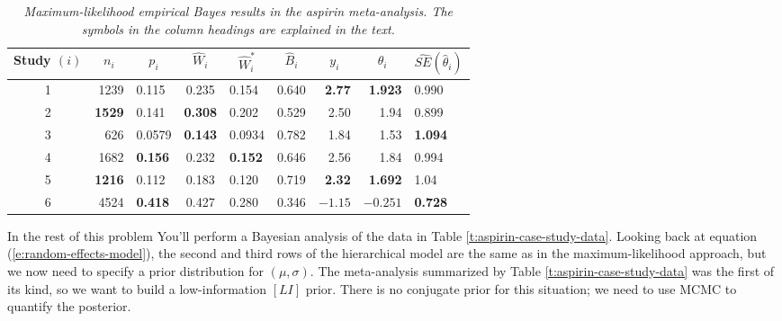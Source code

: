 \documentclass[12pt]{article}
\begin{document}
\begin{table}[t!]

\centering

\caption{\textit{Maximum-likelihood empirical Bayes results in the aspirin meta-analysis. The symbols in the column headings are explained in the text.}}

\label{t:mle-results}

\bigskip

\begin{tabular}{c|rlclcrrl}

Study $( i )$ & \multicolumn{1}{c}{$n_i$} & \multicolumn{1}{c}{$p_i$} & $\hat{ W }_i$ & \multicolumn{1}{c}{$\hat{ W }_i^*$} & $\hat{ B }_i$ & \multicolumn{1}{c}{$y_i$} & \multicolumn{1}{c}{$\hat{ \theta }_i$} & \multicolumn{1}{c}{$\widehat{ SE } \! \left( \hat{ \theta }_i \right)$}\\

\hline

1 & 1239 & 0.115 & 0.235 & 0.154 & 0.640 & \textbf{2.77} & \textbf{1.923} & 0.990 \\

2 & \textbf{1529} & 0.141 & \textbf{0.308} & 0.202 & 0.529 & 2.50 & 1.94 & 0.899 \\

3 & 626 & 0.0579 & \textbf{0.143} & 0.0934 & 0.782 & 1.84 & 1.53 & \textbf{1.094} \\

4 & 1682 & \textbf{0.156} & 0.232 & \textbf{0.152} & 0.646 & 2.56 & 1.84 & 0.994 \\

5 & \textbf{1216} & 0.112 & 0.183 & 0.120 & 0.719 & \textbf{2.32} & \textbf{1.692} & 1.04 \\

6 & 4524 & \textbf{0.418} & 0.427 & 0.280 & 0.346 & $-1.15$ & $-0.251$ & \textbf{0.728}

\end{tabular}

\end{table}

In the rest of this problem You'll perform a Bayesian analysis of the data in Table \ref{t:aspirin-case-study-data}. Looking back at equation (\ref{e:random-effects-model}), the second and third rows of the hierarchical model are the same as in the maximum-likelihood approach, but we now need to specify a prior distribution for $( \mu, \sigma )$. The meta-analysis summarized by Table \ref{t:aspirin-case-study-data} was the first of its kind, so we want to build a low-information $[LI]$ prior. There is no conjugate prior for this situation; we need to use MCMC to quantify the posterior.
\end{document}
